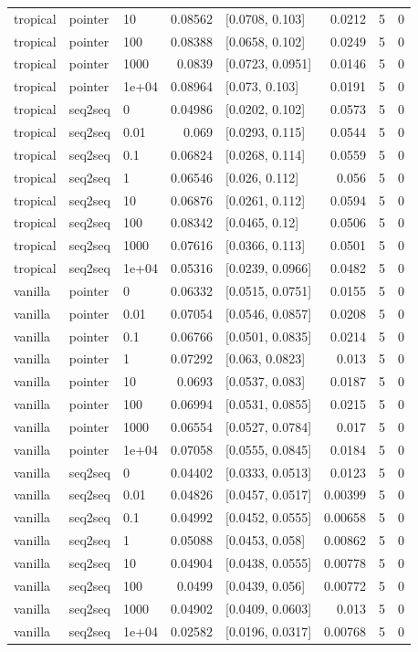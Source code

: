 \documentclass[10pt]{article}
\begin{document}
{\begin{longtable}{lllrlrrr}
tropical & pointer & 10 & 0.08562 & [0.0708, 0.103] & 0.0212 & 5 & 0\\
tropical & pointer & 100 & 0.08388 & [0.0658, 0.102] & 0.0249 & 5 & 0\\
tropical & pointer & 1000 & 0.0839 & [0.0723, 0.0951] & 0.0146 & 5 & 0\\
tropical & pointer & 1e+04 & 0.08964 & [0.073, 0.103] & 0.0191 & 5 & 0\\
tropical & seq2seq & 0 & 0.04986 & [0.0202, 0.102] & 0.0573 & 5 & 0\\
tropical & seq2seq & 0.01 & 0.069 & [0.0293, 0.115] & 0.0544 & 5 & 0\\
tropical & seq2seq & 0.1 & 0.06824 & [0.0268, 0.114] & 0.0559 & 5 & 0\\
tropical & seq2seq & 1 & 0.06546 & [0.026, 0.112] & 0.056 & 5 & 0\\
tropical & seq2seq & 10 & 0.06876 & [0.0261, 0.112] & 0.0594 & 5 & 0\\
tropical & seq2seq & 100 & 0.08342 & [0.0465, 0.12] & 0.0506 & 5 & 0\\
tropical & seq2seq & 1000 & 0.07616 & [0.0366, 0.113] & 0.0501 & 5 & 0\\
tropical & seq2seq & 1e+04 & 0.05316 & [0.0239, 0.0966] & 0.0482 & 5 & 0\\
vanilla & pointer & 0 & 0.06332 & [0.0515, 0.0751] & 0.0155 & 5 & 0\\
vanilla & pointer & 0.01 & 0.07054 & [0.0546, 0.0857] & 0.0208 & 5 & 0\\
vanilla & pointer & 0.1 & 0.06766 & [0.0501, 0.0835] & 0.0214 & 5 & 0\\
vanilla & pointer & 1 & 0.07292 & [0.063, 0.0823] & 0.013 & 5 & 0\\
vanilla & pointer & 10 & 0.0693 & [0.0537, 0.083] & 0.0187 & 5 & 0\\
vanilla & pointer & 100 & 0.06994 & [0.0531, 0.0855] & 0.0215 & 5 & 0\\
vanilla & pointer & 1000 & 0.06554 & [0.0527, 0.0784] & 0.017 & 5 & 0\\
vanilla & pointer & 1e+04 & 0.07058 & [0.0555, 0.0845] & 0.0184 & 5 & 0\\
vanilla & seq2seq & 0 & 0.04402 & [0.0333, 0.0513] & 0.0123 & 5 & 0\\
vanilla & seq2seq & 0.01 & 0.04826 & [0.0457, 0.0517] & 0.00399 & 5 & 0\\
vanilla & seq2seq & 0.1 & 0.04992 & [0.0452, 0.0555] & 0.00658 & 5 & 0\\
vanilla & seq2seq & 1 & 0.05088 & [0.0453, 0.058] & 0.00862 & 5 & 0\\
vanilla & seq2seq & 10 & 0.04904 & [0.0438, 0.0555] & 0.00778 & 5 & 0\\
vanilla & seq2seq & 100 & 0.0499 & [0.0439, 0.056] & 0.00772 & 5 & 0\\
vanilla & seq2seq & 1000 & 0.04902 & [0.0409, 0.0603] & 0.013 & 5 & 0\\
vanilla & seq2seq & 1e+04 & 0.02582 & [0.0196, 0.0317] & 0.00768 & 5 & 0\\
\bottomrule
\end{longtable}
}
\end{document}
